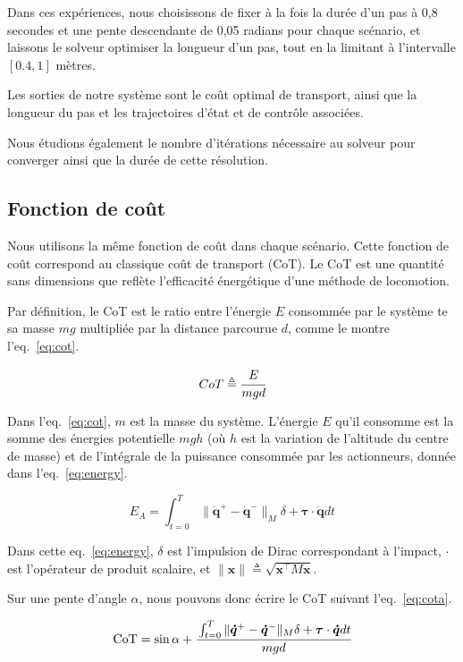 \documentclass[french,A4paper,]{book}
\begin{document}
Dans ces expériences, nous choisissons de fixer à la fois la durée d'un
pas à 0,8 secondes et une pente descendante de 0,05 radians pour chaque
scénario, et laissons le solveur optimiser la longueur d'un pas, tout en
la limitant à l'intervalle \([0.4,1]\) mètres.

Les sorties de notre système sont le coût optimal de transport, ainsi
que la longueur du pas et les trajectoires d'état et de contrôle
associées.

Nous étudions également le nombre d'itérations nécessaire au solveur
pour converger ainsi que la durée de cette résolution.

\subsection{Fonction de coût}\label{sec:costfunc}

Nous utilisons la même fonction de coût dans chaque scénario. Cette
fonction de coût correspond au classique coût de transport (CoT). Le CoT
est une quantité sans dimensions que reflète l'efficacité énergétique
d'une méthode de locomotion.

Par définition, le CoT est le ratio entre l'énergie \(E\) consommée par
le système te sa masse \(mg\) multipliée par la distance parcourue
\(d\), comme le montre l'eq.~\ref{eq:cot}.

\begin{equation} CoT \triangleq \cfrac{E}{mgd} \label{eq:cot}\end{equation}

Dans l'eq.~\ref{eq:cot}, \(m\) est la masse du système. L'énergie \(E\)
qu'il consomme est la somme des énergies potentielle \(mgh\) (où \(h\)
est la variation de l'altitude du centre de masse) et de l'intégrale de
la puissance consommée par les actionneurs, donnée dans
l'eq.~\ref{eq:energy}.

\begin{equation} E_A = \int_{t=0}^T\|\bm{\dot q}^+ - \bm{\dot q}^-\|_M\delta+\bm\tau\cdot\bm{\dot q}dt \label{eq:energy}\end{equation}

Dans cette eq.~\ref{eq:energy}, \(\delta\) est l'impulsion de Dirac
correspondant à l'impact, \(\cdot\) est l'opérateur de produit scalaire,
et \(\|\bm x\| \triangleq \sqrt{\bm x^\top M\bm x}\).

Sur une pente d'angle \(\alpha\), nous pouvons donc écrire le CoT
suivant l'eq.~\ref{eq:cota}.

\begin{equation} \text{CoT} = \sin\alpha + \cfrac{\int_{t=0}^T\|\bm{\dot q}^+ - \bm{\dot q}^-\|_M\delta+\bm\tau\cdot\bm{\dot
q}dt}{mgd} \label{eq:cota}\end{equation}
\end{document}
